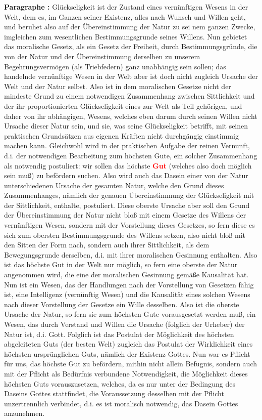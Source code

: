 \documentclass[a4paper,12pt,twoside]{book}
\newcommand{\match}[1]{\textcolor{red}{\textbf{#1}}}
\begin{document}
	\textbf{Paragraphe : }
	Glückseligkeit ist der Zustand eines vernünftigen Wesens in der Welt, dem es, im Ganzen seiner Existenz, alles nach Wunsch und Willen geht, und beruhet also auf der Übereinstimmung der Natur zu sei nem ganzen Zwecke, imgleichen zum wesentlichen Bestimmungsgrunde seines Willens. Nun gebietet das moralische Gesetz, als ein Gesetz der Freiheit, durch Bestimmungsgründe, die von der Natur und der Übereinstimmung derselben zu unserem Begehrungsvermögen (als Triebfedern) ganz unabhängig sein sollen; das handelnde vernünftige Wesen in der Welt aber ist doch nicht zugleich Ursache der Welt und der Natur selbst. Also ist in dem moralischen Gesetze nicht der mindeste Grund zu einem notwendigen Zusammenhang zwischen Sittlichkeit und der ihr proportionierten Glückseligkeit eines zur Welt als Teil gehörigen, und daher von ihr abhängigen, Wesens, welches eben darum durch seinen Willen nicht Ursache dieser Natur sein, und sie, was seine Glückseligkeit betrifft, mit seinen praktischen Grundsätzen aus eigenen Kräften nicht durchgängig einstimmig machen kann. Gleichwohl wird in der praktischen Aufgabe der reinen Vernunft, d.i. der notwendigen Bearbeitung zum höchsten Gute, ein solcher Zusammenhang als notwendig postuliert: wir sollen das höchste \match{Gut} (welches also doch möglich sein muß) zu befördern suchen. Also wird auch das Dasein einer von der Natur unterschiedenen Ursache der gesamten Natur, welche den Grund dieses Zusammenhanges, nämlich der genauen Übereinstimmung der Glückseligkeit mit der Sittlichkeit, enthalte, postuliert. Diese oberste Ursache aber soll den Grund der Übereinstimmung der Natur nicht bloß mit einem Gesetze des Willens der vernünftigen Wesen, sondern  mit der Vorstellung dieses Gesetzes, so fern diese es sich zum obersten Bestimmungsgrunde des Willens setzen, also nicht bloß mit den Sitten der Form nach, sondern auch ihrer Sittlichkeit, als dem Bewegungsgrunde derselben, d.i. mit ihrer moralischen Gesinnung enthalten. Also ist das höchste Gut in der Welt nur möglich, so fern eine oberste der Natur angenommen wird, die eine der moralischen Gesinnung gemäße Kausalität hat. Nun ist ein Wesen, das der Handlungen nach der Vorstellung von Gesetzen fähig ist, eine Intelligenz (vernünftig Wesen) und die Kausalität eines solchen Wesens nach dieser Vorstellung der Gesetze ein Wille desselben. Also ist die oberste Ursache der Natur, so fern sie zum höchsten Gute vorausgesetzt werden muß, ein Wesen, das durch Verstand und Willen die Ursache (folglich der Urheber) der Natur ist, d.i. Gott. Folglich ist das Postulat der Möglichkeit des höchsten abgeleiteten Guts (der besten Welt) zugleich das Postulat der Wirklichkeit eines höchsten ursprünglichen Guts, nämlich der Existenz Gottes. Nun war es Pflicht für uns, das höchste Gut zu befördern, mithin nicht allein Befugnis, sondern auch mit der Pflicht als Bedürfnis verbundene Notwendigkeit, die Möglichkeit dieses höchsten Guts vorauszusetzen, welches, da es nur unter der Bedingung des Daseins Gottes stattfindet, die Voraussetzung desselben mit der Pflicht unzertrennlich verbindet, d.i. es ist moralisch notwendig, das Dasein Gottes anzunehmen. 
	
\end{document}
